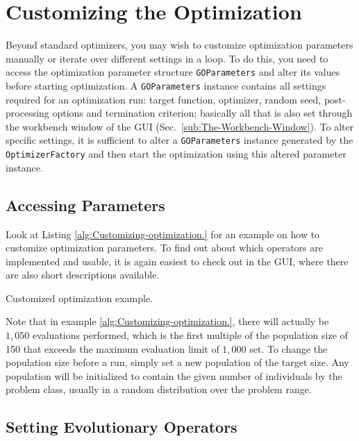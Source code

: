 \section{Customizing the Optimization}

Beyond standard optimizers, you may wish to customize optimization
parameters manually or iterate over different settings in a loop.
To do this, you need to access the optimization parameter structure
\texttt{GOParameters} and alter its values before starting optimization.
A \texttt{GOParameters} instance contains all settings required for
an optimization run: target function, optimizer, random seed, post-processing
options and termination criterion; basically all that is also set
through the workbench window of the GUI (Sec.~\ref{sub:The-Workbench-Window}).
To alter specific settings, it is sufficient to alter a \texttt{GOParameters}
instance generated by the \texttt{OptimizerFactory} and then start
the optimization using this altered parameter instance.


\subsection{Accessing Parameters}

Look at Listing \ref{alg:Customizing-optimization.} for an example
on how to customize optimization parameters. To find out about which
operators are implemented and usable, it is again easiest to check
out in the GUI, where there are also short descriptions available.

\begin{algorithm}


\caption{Customized optimization example.\label{alg:Customizing-optimization.}}
\end{algorithm}


Note that in example \ref{alg:Customizing-optimization.}, there will
actually be $1,050$ evaluations performed, which is the first multiple
of the population size of 150 that exceeds the maximum evaluation
limit of $1,000$ set. To change the population size before a run,
simply set a new population of the target size. Any population will
be initialized to contain the given number of individuals by the problem
class, usually in a random distribution over the problem range.


\subsection{Setting Evolutionary Operators\label{sub:Setting-Evolutionary-Operators}}

